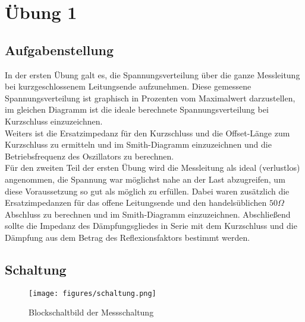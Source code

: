 \documentclass[12pt,a4paper,ngerman]{article}
\begin{document}


%
%

\section{Übung 1}
\subsection{Aufgabenstellung}
In der ersten Übung galt es, die Spannungsverteilung über die ganze Messleitung bei kurzgeschlossenem Leitungsende aufzunehmen. Diese gemessene Spannungsverteilung ist graphisch in Prozenten vom Maximalwert darzustellen, im gleichen Diagramm ist die ideale berechnete Spannungsverteilung bei Kurzschluss einzuzeichnen. \\
Weiters ist die Ersatzimpedanz für den Kurzschluss und die Offset-Länge zum Kurzschluss zu ermitteln und im Smith-Diagramm einzuzeichnen und die Betriebsfrequenz des Oszillators zu berechnen. \\
Für den zweiten Teil der ersten Übung wird die Messleitung als ideal (verlustlos) angenommen, die Spannung war möglichst nahe an der Last abzugreifen, um diese Voraussetzung so gut als möglich zu erfüllen. Dabei waren zusätzlich die Ersatzimpedanzen für das offene Leitungsende und den handelsüblichen $50\Omega$ Abschluss zu berechnen und im Smith-Diagramm einzuzeichnen. Abschließend sollte die Impedanz des Dämpfungsgliedes in Serie mit dem Kurzschluss und die Dämpfung aus dem Betrag des Reflexionsfaktors bestimmt werden. 
\subsection{Schaltung}
\begin{figure}[h!]
\centering
\texttt{[image: figures/schaltung.png]}
\caption{Blockschaltbild der Messschaltung}
\end{figure}
\pagebreak
 
\end{document}
